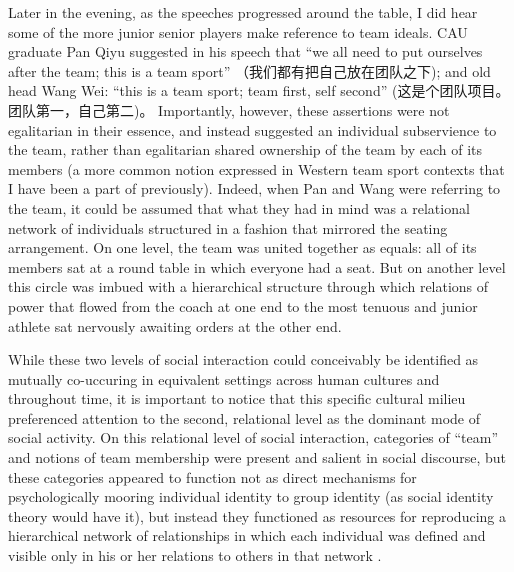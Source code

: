 Later in the evening, as the speeches progressed around the table, I did hear some of the more junior senior players make reference to team ideals.   CAU graduate Pan Qiyu suggested in his speech that ``we all need to put ourselves after the team; this is a team sport'' （我们都有把自己放在团队之下); and old head Wang Wei: ``this is a team sport; team first, self second'' (这是个团队项目。团队第一，自己第二)。 Importantly, however, these assertions were not egalitarian in their essence, and instead suggested an individual subservience to the team, rather than egalitarian shared ownership of the team by each of its members (a more common notion expressed in Western team sport contexts that I have been a part of previously).  Indeed, when Pan and Wang were referring to the team, it could be assumed that what they had in mind was a relational network of individuals structured in a fashion that mirrored the seating arrangement. On one level, the team was united together as equals: all of its members sat at a round table in which everyone had a seat. But on another level this circle was imbued with a hierarchical structure through which relations of power that flowed from the coach at one end to the most tenuous and junior athlete sat nervously awaiting orders at the other end.

While these two levels of social interaction could conceivably be identified as mutually co-uccuring in equivalent settings across human cultures and throughout time, it is important to notice that this specific cultural milieu preferenced attention to the second, relational level as the dominant mode of social activity.  On this relational level of social interaction, categories of ``team'' and notions of team membership were present and salient in social discourse, but these categories appeared to function not as direct mechanisms for psychologically mooring individual identity to group identity (as social identity theory would have it), but instead they functioned as resources for reproducing a hierarchical network of relationships in which each individual was defined and visible only in his or her relations to others in that network \cite{Yuki2003}.

